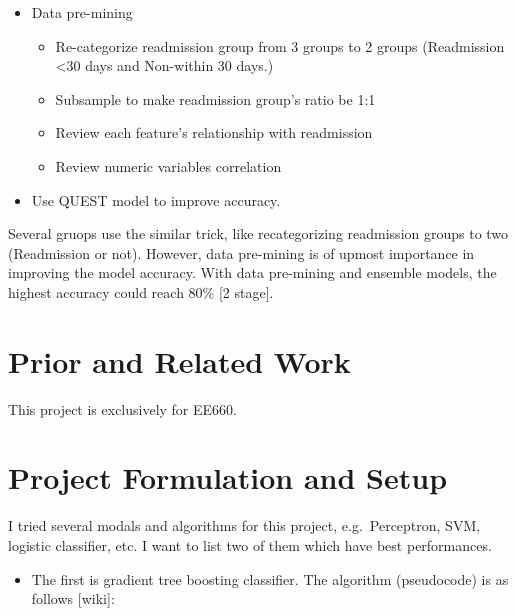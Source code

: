 \documentclass[]{article}
\begin{document}
\begin{itemize}
\itemsep1pt\parskip0pt
\item
  Data pre-mining

  \begin{itemize}
  \itemsep1pt\parskip0pt
  \item
    Re-categorize readmission group from 3 groups to 2 groups
    (Readmission \textless{}30 days and Non-within 30 days.)
  \item
    Subsample to make readmission group's ratio be 1:1
  \item
    Review each feature's relationship with readmission
  \item
    Review numeric variables correlation
  \end{itemize}
\item
  Use QUEST model to improve accuracy.
\end{itemize}

Several gruops use the similar trick, like recategorizing readmission
groups to two (Readmission or not). However, data pre-mining is of
upmost importance in improving the model accuracy. With data pre-mining
and ensemble models, the highest accuracy could reach 80\% {[}2
stage{]}.

\section{Prior and Related Work}\label{prior-and-related-work}

This project is exclusively for EE660.

\section{Project Formulation and
Setup}\label{project-formulation-and-setup}

I tried several modals and algorithms for this project, e.g.~Perceptron,
SVM, logistic classifier, etc. I want to list two of them which have
best performances.

\begin{itemize}
\itemsep1pt\parskip0pt
\item
  The first is gradient tree boosting classifier. The algorithm
  (pseudocode) is as follows {[}wiki{]}:
\end{itemize}
\end{document}
